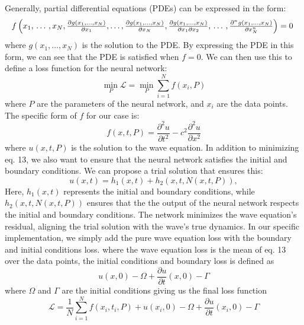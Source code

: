 \documentclass[twoside,11pt]{report}
\begin{document}
    Generally, partial differential equations (PDEs) can be expressed in the form:
    \begin{equation}
    \resizebox{1.0\textwidth}{!}{$
        f\left(x_1, \, \dots \, , x_N, \frac{\partial g(x_1,\dots,x_N) }{\partial x_1}, 
            \dots , \frac{\partial g(x_1,\dots,x_N) }{\partial x_N}, \frac{\partial g(x_1,\dots,x_N) }
        {\partial x_1\partial x_2}, \, \dots \, , \frac{\partial^n g(x_1,\dots,x_N) }
        {\partial x_N^n} \right) = 0$
    }
    \end{equation}
    where $g(x_1,\dots,x_N)$ is the solution to the PDE. By expressing the PDE in this form, we can 
    see that the PDE is satisfied when $f=0$. We can then use this to define a loss function for the neural network:
    \begin{equation}
    \min_{P} \mathcal{L} = \min_{P} \sum_{i=1}^{N} f(x_i, P)
    \end{equation}
    where $P$ are the parameters of the neural network, and $x_i$ are the data points. 
    The specific form of $f$ for our case is:
    \begin{equation}
    f(x,t,P) = \frac{\partial^2 u}{\partial t^2} - c^2 \frac{\partial^2 u}{\partial x^2}
    \end{equation}
    where $u(x,t,P)$ is the solution to the wave equation. 
    In addition to minimizing eq. 13, we also want to ensure that the neural network satisfies the 
    initial and boundary conditions. We can propose a trial solution that ensures this:
    \begin{equation}
    u(x, t) = h_1(x, t) + h_2(x, t, N(x, t, P)),
    \end{equation}
    Here, $h_1(x,t)$ represents the initial and boundary conditions,
    while $h_2(x,t, N(x,t,P))$ ensures that the the output of the neural network respects 
    the initial and boundary conditions.
    The network minimizes the wave equation's residual, aligning the trial solution with the wave's true dynamics.
    In our specific implementation, we simply add the pure wave equation loss with the boundary and initial conditions loss.
    where the wave equation loss is the mean of eq. 13 over the data points, the initial conditions and boundary loss
    is defined as
    \begin{equation}
        u(x, 0) - \Omega  + \frac{\partial u}{\partial t}(x, 0) - \Gamma
    \end{equation}
    where $\Omega$ and $\Gamma$ are the initial conditions
    giving us the final loss function
    \begin{equation}
        \mathcal{L} = \frac{1}{N}\sum_{i=1}^{N} f(x_i, t_i, P) + u(x_i, 0) - \Omega  + 
        \frac{\partial u}{\partial t}(x_i, 0) - \Gamma
    \end{equation}
\end{document}
